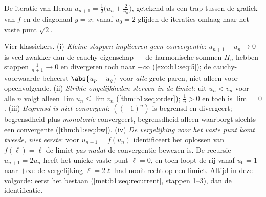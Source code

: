 \begin{omfigure}

{\small De iteratie van Heron $u_{n+1} = \frac12\bigl(u_n +
\frac{2}{u_n}\bigr)$, getekend als een trap tussen de grafiek van $f$ en
de diagonaal $y = x$: vanaf $u_0 = 2$ glijden de iteraties omlaag naar
het vaste punt $\sqrt 2$.}
\end{omfigure}

\begin{remark}
Vier klassiekers. (i) \emph{Kleine stappen impliceren geen convergentie}:
$u_{n+1} - u_n \to 0$ is veel zwakker dan de cauchy-eigenschap --- de
harmonische sommen $H_n$ hebben stappen $\frac{1}{n+1} \to 0$ en
divergeren toch naar $+\infty$ (\cref{exo:b1:seq:5}); de
cauchy-voorwaarde beheerst $\abs{u_p - u_q}$ voor \emph{alle} grote
paren, niet alleen voor opeenvolgende. (ii) \emph{Strikte ongelijkheden
sterven in de limiet}: uit $u_n < v_n$ voor alle $n$ volgt alleen $\lim
u_n \leq \lim v_n$ (\cref{thm:b1:seq:order}); $\frac1n > 0$ en toch is
$\lim = 0$. (iii) \emph{Begrensd is niet convergent}: $((-1)^n)$ is
begrensd en divergeert; begrensdheid plus \emph{monotonie} convergeert,
begrensdheid alleen waarborgt slechts een convergente 
(\cref{thm:b1:seq:bw}). (iv) \emph{De vergelijking voor het vaste punt
komt tweede, niet eerste}: voor $u_{n+1} = f(u_n)$ identificeert het
oplossen van $f(\ell) = \ell$ de limiet \emph{pas nadat} de convergentie
bewezen is. De recursie $u_{n+1} = 2u_n$ heeft het unieke vaste punt
$\ell = 0$, en toch loopt de rij vanaf $u_0 = 1$ naar $+\infty$: de
vergelijking $\ell = 2\ell$ had nooit recht op een limiet. Altijd in deze
volgorde: eerst het bestaan (\cref{met:b1:seq:recurrent}, stappen 1--3),
dan de identificatie.
\end{remark}

